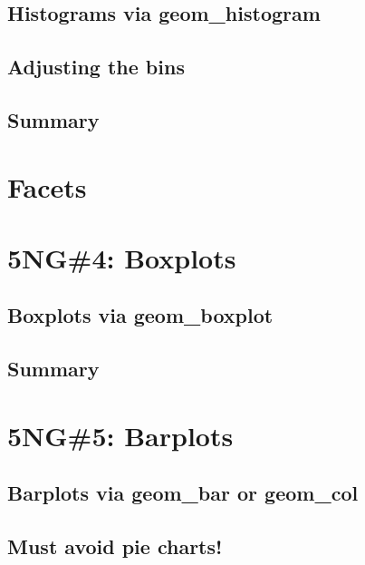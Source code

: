 \documentclass[12pt, krantz2,]{krantz}
\begin{document}
\hypertarget{geomhistogram}{%
\subsection{Histograms via geom\_histogram}\label{geomhistogram}}

\hypertarget{adjustbins}{%
\subsection{Adjusting the bins}\label{adjustbins}}

\hypertarget{summary-2}{%
\subsection{Summary}\label{summary-2}}

\hypertarget{facets}{%
\section{Facets}\label{facets}}

\hypertarget{boxplots}{%
\section{5NG\#4: Boxplots}\label{boxplots}}

\hypertarget{geomboxplot}{%
\subsection{Boxplots via geom\_boxplot}\label{geomboxplot}}

\hypertarget{summary-3}{%
\subsection{Summary}\label{summary-3}}

\hypertarget{geombar}{%
\section{5NG\#5: Barplots}\label{geombar}}

\hypertarget{barplots-via-geom_bar-or-geom_col}{%
\subsection{Barplots via geom\_bar or geom\_col}\label{barplots-via-geom_bar-or-geom_col}}

\hypertarget{must-avoid-pie-charts}{%
\subsection{Must avoid pie charts!}\label{must-avoid-pie-charts}}
\end{document}
